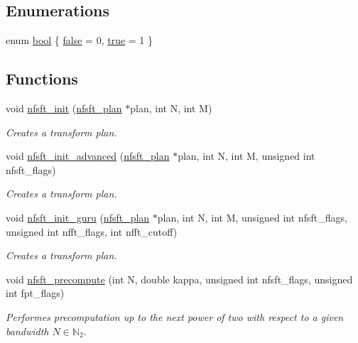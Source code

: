 \subsection*{Enumerations}
\begin{CompactItemize}
\item 
enum \hyperlink{group__nfsft_gf6a258d8f3ee5206d682d799316314b1}{bool} \{ \hyperlink{group__nfsft_ggf6a258d8f3ee5206d682d799316314b1e9de385ef6fe9bf3360d1038396b884c}{false} =  0, 
\hyperlink{group__nfsft_ggf6a258d8f3ee5206d682d799316314b108f175a5505a10b9ed657defeb050e4b}{true} =  1
 \}
\end{CompactItemize}
\subsection*{Functions}
\begin{CompactItemize}
\item 
void \hyperlink{group__nfsft_g65cda3f4a3edc5eb39c697cf34b1f0b9}{nfsft\_\-init} (\hyperlink{structnfsft__plan}{nfsft\_\-plan} $\ast$plan, int N, int M)
\begin{CompactList}\small\item\em Creates a transform plan. \item\end{CompactList}\item 
void \hyperlink{group__nfsft_ge7dca3e41afdb39e8c518af414878c18}{nfsft\_\-init\_\-advanced} (\hyperlink{structnfsft__plan}{nfsft\_\-plan} $\ast$plan, int N, int M, unsigned int nfsft\_\-flags)
\begin{CompactList}\small\item\em Creates a transform plan. \item\end{CompactList}\item 
void \hyperlink{group__nfsft_g60466ed37643b6b7b7c1638056604d2b}{nfsft\_\-init\_\-guru} (\hyperlink{structnfsft__plan}{nfsft\_\-plan} $\ast$plan, int N, int M, unsigned int nfsft\_\-flags, unsigned int nfft\_\-flags, int nfft\_\-cutoff)
\begin{CompactList}\small\item\em Creates a transform plan. \item\end{CompactList}\item 
void \hyperlink{group__nfsft_gbe87aeea1f7cfef9ae8febb16d702f3b}{nfsft\_\-precompute} (int N, double kappa, unsigned int nfsft\_\-flags, unsigned int fpt\_\-flags)
\begin{CompactList}\small\item\em Performes precomputation up to the next power of two with respect to a given bandwidth $N \in \mathbb{N}_2$. \item\end{CompactList}\item 

\end{CompactItemize}
